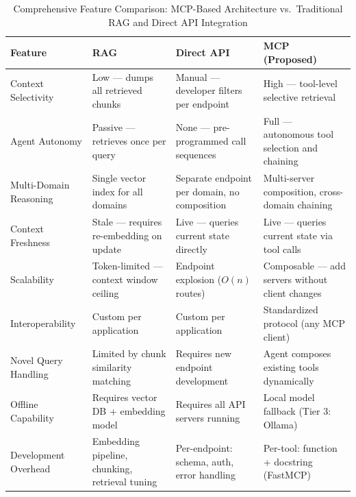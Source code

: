 \documentclass[journal]{IEEEtran}
\begin{document}
\begin{table}[!t]
    \centering
    \caption{Comprehensive Feature Comparison: MCP-Based Architecture vs.\
    Traditional RAG and Direct API Integration}
    \label{tab:comparison}
    \begin{tabular}{@{}p{3.5cm}p{3.8cm}p{3.8cm}p{3.8cm}@{}}
        \toprule
        \textbf{Feature} & \textbf{RAG} & \textbf{Direct API} & \textbf{MCP
        (Proposed)} \\
        \midrule
        Context Selectivity & Low --- dumps all retrieved chunks &
            Manual --- developer filters per endpoint &
            High --- tool-level selective retrieval \\
        \addlinespace
        Agent Autonomy & Passive --- retrieves once per query &
            None --- pre-programmed call sequences &
            Full --- autonomous tool selection and chaining \\
        \addlinespace
        Multi-Domain Reasoning & Single vector index for all domains &
            Separate endpoint per domain, no composition &
            Multi-server composition, cross-domain chaining \\
        \addlinespace
        Context Freshness & Stale --- requires re-embedding on update &
            Live --- queries current state directly &
            Live --- queries current state via tool calls \\
        \addlinespace
        Scalability & Token-limited --- context window ceiling &
            Endpoint explosion ($O(n)$ routes) &
            Composable --- add servers without client changes \\
        \addlinespace
        Interoperability & Custom per application &
            Custom per application &
            Standardized protocol (any MCP client) \\
        \addlinespace
        Novel Query Handling & Limited by chunk similarity matching &
            Requires new endpoint development &
            Agent composes existing tools dynamically \\
        \addlinespace
        Offline Capability & Requires vector DB + embedding model &
            Requires all API servers running &
            Local model fallback (Tier 3: Ollama) \\
        \addlinespace
        Development Overhead & Embedding pipeline, chunking, retrieval tuning &
            Per-endpoint: schema, auth, error handling &
            Per-tool: function + docstring (FastMCP) \\
        \bottomrule
    \end{tabular}
\end{table}
\end{document}
